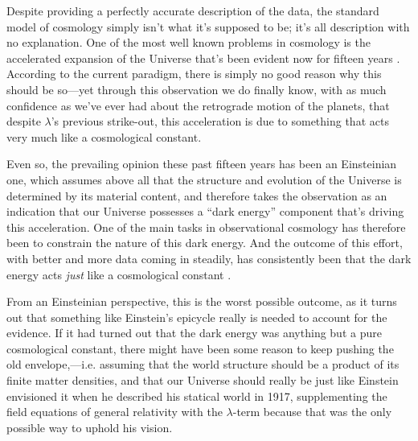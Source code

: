 \documentclass[12 pt]{article}
\begin{document}
Despite providing a perfectly accurate description of the data, the standard model of cosmology simply isn't what it's supposed to be; it's all description with no explanation. One of the most well known problems in cosmology is the accelerated expansion of the Universe that's been evident now for fifteen years \citep{Riess1998,Perlmutter1999}. According to the current paradigm, there is simply no good reason why this should be so---yet through this observation we do finally know, with as much confidence as we've ever had about the retrograde motion of the planets, that despite $\lambda$'s previous strike-out, this acceleration is due to something that acts very much like a cosmological constant. 

Even so, the prevailing opinion these past fifteen years has been an Einsteinian one, which assumes above all that the structure and evolution of the Universe is determined by its material content, and therefore takes the observation as an indication that our Universe possesses a ``dark energy'' component that's driving this acceleration. One of the main tasks in observational cosmology has therefore been to constrain the nature of this dark energy. And the outcome of this effort, with better and more data coming in steadily, has consistently been that the dark energy acts \textit{just} like a cosmological constant \citep{Riess2004,Riess2007,Davis2007,Hicken2009,Riess2011,Suzuki2012,Hinshaw2013,Ade2013}.

From an Einsteinian perspective, this is the worst possible outcome, as it turns out that something like Einstein's epicycle really is needed to account for the evidence. If it had turned out that the dark energy was anything but a pure cosmological constant, there might have been some reason to keep pushing the old envelope,---i.e. assuming that the world structure should be a product of its finite matter densities, and that our Universe should really be just like Einstein envisioned it when he described his statical world in 1917, supplementing the field equations of general relativity with the $\lambda$-term because that was the only possible way to uphold his vision.
\end{document}
